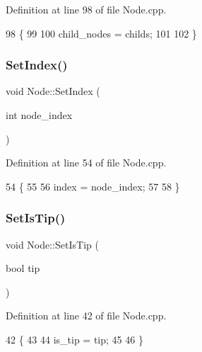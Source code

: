 Definition at line 98 of file Node.\+cpp.


\begin{DoxyCode}
98                                                 \{
99   
100   child\_nodes = childs;
101   
102 \}
\end{DoxyCode}
\mbox{\label{classNode_a6f2acc7b954108a6fe266838fce50ef6}} 
\subsubsection{\texorpdfstring{Set\+Index()}{SetIndex()}}
{\footnotesize\ttfamily void Node\+::\+Set\+Index (\begin{DoxyParamCaption}\item[{int}]{node\+\_\+index }\end{DoxyParamCaption})}



Definition at line 54 of file Node.\+cpp.


\begin{DoxyCode}
54                                  \{
55   
56   index = node\_index;
57   
58 \}
\end{DoxyCode}
\mbox{\label{classNode_a89bff92e3930d521439395ccf332418f}} 
\subsubsection{\texorpdfstring{Set\+Is\+Tip()}{SetIsTip()}}
{\footnotesize\ttfamily void Node\+::\+Set\+Is\+Tip (\begin{DoxyParamCaption}\item[{bool}]{tip }\end{DoxyParamCaption})}



Definition at line 42 of file Node.\+cpp.


\begin{DoxyCode}
42                            \{
43   
44   is\_tip = tip;
45   
46 \}
\end{DoxyCode}
\mbox{\label{classNode_a9d7592d6bf479825eb411a244f4d7ad2}} 
